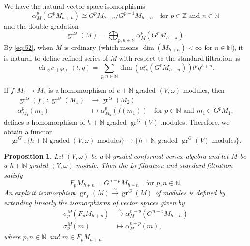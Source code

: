 \documentclass[a4paper, 12pt, reqno]{amsart}
\newtheorem{proposition}[theorem]{Proposition}
\theoremstyle{remark}
\numberwithin{equation}{subsection}
\DeclareMathOperator{\gr}{gr}
\DeclareMathOperator{\ch}{ch}
\begin{document}
We have the natural vector space isomorphisms
\begin{equation*}
  \alpha_M^p(G^pM_{h + n}) \cong G^pM_{h + n}/G^{p - 1}M_{h + n} \quad \text{for }p \in \mathbb{Z}\text{ and }n \in \mathbb{N}
\end{equation*}
and the double gradation
\begin{equation}
  \label{eq:52}
  \gr^G(M) =\bigoplus_{p, n \in \mathbb{N}}\alpha_M^p(G^pM_{h + n}).
\end{equation}
By \eqref{eq:52}, when $M$ is ordinary (which means $\dim(M_{h + n}) < \infty$ for $n \in \mathbb{N}$), it is natural to define refined series of $M$ with respect to the standard filtration as
\begin{equation*}
  \ch_{\gr^G(M)}(t, q) = \sum_{p, n \in \mathbb{N}}\dim(\alpha_m^p(G^pM_{h + n}))t^pq^{h + n}.
\end{equation*}

If $f: M_1 \to M_2$ is a homomorphism of $h + \mathbb{N}$-graded $(V, \omega)$-modules, then
\begin{align*}
  \gr^G(f): \gr^G(M_1) &\to \gr^G(M_2) \\
  \alpha^p_{M_1}(m_1) &\mapsto \alpha^p_{M_2}(f(m_1)) \quad \text{for }p \in \mathbb{N}\text{ and } m_1 \in G^pM_1,
\end{align*}
defines a homomorphism of $h + \mathbb{N}$-graded $\gr^G(V)$-modules.
Therefore, we obtain a functor
\begin{equation*}
  \gr^G: \{\text{$h + \mathbb{N}$-graded $(V, \omega)$-modules}\} \to \{\text{$h + \mathbb{N}$-graded $\gr^G(V)$-modules}\}.
\end{equation*}

\begin{proposition}
  \label{prp:12}
  Let $(V, \omega)$ be a $\mathbb{N}$-graded conformal vertex algebra and let $M$ be a $h + \mathbb{N}$-graded $(V, \omega)$-module.
  Then the Li filtration and standard filtration satisfy
  \begin{equation*}
    F_pM_{h + n} = G^{n - p}M_{h + n} \quad \text{for }p, n \in \mathbb{N}.
  \end{equation*}
  An explicit isomorphism $\gr_F(M) \xrightarrow{\sim} \gr^G(M)$ of modules is defined by extending linearly the isomorphisms of vector spaces given by
  \begin{align*}
    \sigma^M_p(F_pM_{h + n}) &\xrightarrow{\sim} \alpha^{n - p}_M(G^{n - p}M_{h + n}) \\
    \sigma^M_p(m) &\mapsto \alpha^{n - p}_M(m),
  \end{align*}
  where $p, n \in \mathbb{N}$ and $m \in F_pM_{h + n}$.
\end{proposition}
\end{document}
